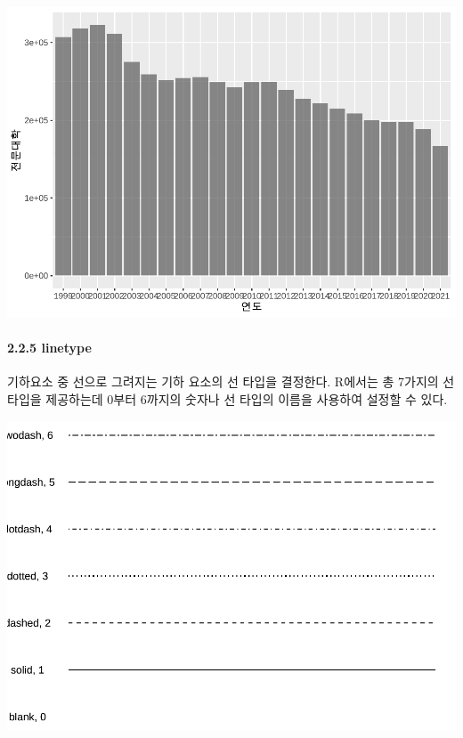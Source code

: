\documentclass[
]{article}
\begin{document}
\includegraphics{chap3_files/figure-latex/unnamed-chunk-10-2.pdf}

\hypertarget{linetype}{%
\paragraph{2.2.5 linetype}\label{linetype}}

기하요소 중 선으로 그려지는 기하 요소의 선 타입을 결정한다. R에서는 총 7가지의 선 타입을 제공하는데 0부터 6까지의 숫자나 선 타입의 이름을 사용하여 설정할 수 있다.

\includegraphics{chap3_files/figure-latex/unnamed-chunk-11-1.pdf}
\end{document}

